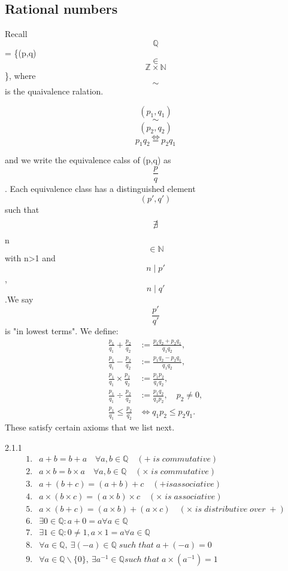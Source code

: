 \documentclass[a4paper]{article}
\def\zz{{\mathbb Z}}
\def\nn{{\mathbb N}}
\begin{document}
\subsection{Rational numbers}
Recall $$ \mathbb{Q}$$ = \{(p,q) $$\in$$ $$\zz \times \nn$$\}, where $$\sim$$ is the quaivalence ralation.\\
\begin{center}
    $$(p_1,q_1)$$ $$\sim$$ $$(p_2,q_2)$$ $$\iff$$ $$p_1q_2=p_2q_1$$
\end{center}
and we write the equivalence calss of (p,q) as $$\frac{p}{q}$$. Each equivalence class has a distinguished element $$(p',q')$$ such that $$\slashed{\exists}$$ n$$\in \mathbb{N}$$ with n>1 and $$n \mid p'$$,$$n\mid q'$$.We say $$\frac{p'}{q'}$$ is "in lowest terms". We define:\\
\begin{align*}
    \frac{p_1}{q_1}+\frac{p_2}{q_2} &:= \frac{p_1q_2+p_2q_1}{q_1q_2},\\
    \frac{p_1}{q_1}-\frac{p_2}{q_2} &:= \frac{p_1q_2-p_2q_1}{q_1q_2},\\
    \frac{p_1}{q_1} \times \frac{p_2}{q_2} &:= \frac{p_1p_2}{q_1q_2},\\
    \frac{p_1}{q_1} \div \frac{p_2}{q_2} &:= \frac{p_1q_2}{q_1p_2}, \quad p_2 \neq 0,\\
    \frac{p_1}{q_1} \leq \frac{p_2}{q_2} & \iff q_1p_2 \leq p_2q_1. 
\end{align*}
These satisfy certain axioms that we list next.
\begin{axioms}{2.1.1}{}
    \begin{align*}
        1. &a+b=b+a \quad \forall a,b \in \mathbb{Q} \quad (+ \; is \; commutative)\\
        2. &a\times b= b\times a \quad \forall a,b \in \mathbb{Q} \quad(\times  \; is\; commutative)\\ 
        3. &a+(b+c)=(a+b)+c \quad(+ is associative)\\
        4. &a\times (b\times c)= (a\times b)\times c \quad(\times\; is\; associative)\\
        5. &a\times(b+c)=(a\times b)+(a\times c) \quad(\times \;is \; distributive \;over\; +)\\
        6. &\exists 0 \in \mathbb{Q}: a+0=a \forall a \in \mathbb{Q}\\
        7. &\exists 1 \in \mathbb{Q}:0 \neq 1,a \times 1=a \forall a \in \mathbb{Q}\\
        8. &\forall a \in \mathbb{Q} ,\: \exists(-a) \in \mathbb{Q}\; such \;that\; a+(-a)=0\\
        9. &\forall a \in \mathbb{Q}\backslash \{0\},\:\exists a^{-1} \in \mathbb{Q} such\; that\; a\times (a^{-1})=1
    \end{align*}
\end{axioms}
\end{document}
